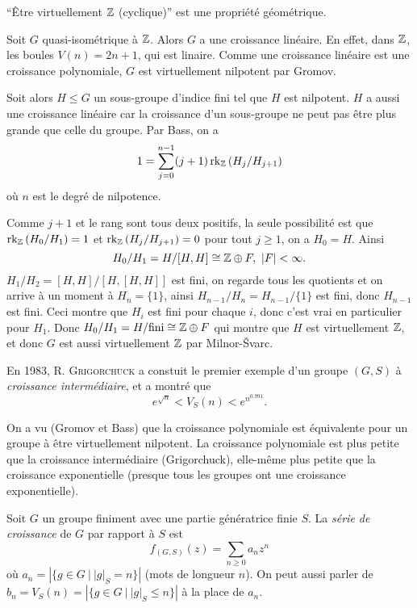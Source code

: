     \begin{cor}
      ``Être virtuellement $\mathbb{Z}$ (cyclique)'' est une propriété géométrique.
    \end{cor}


    \begin{preuve}
      Soit $G$ quasi-isométrique à $\mathbb{Z}$. Alors $G$ a une croissance linéaire. En effet, dans $\mathbb{Z}$, les boules
      $V(n) = 2n + 1$, qui est linaire. Comme une croissance linéaire est une croissance polynomiale, $G$ est
      virtuellement nilpotent par Gromov.

      Soit alors $H \leq G$ un sous-groupe d'indice fini tel que $H$ est nilpotent. $H$ a aussi une croissance
      linéaire car la croissance d'un sous-groupe ne peut pas être plus grande que celle du groupe. Par Bass,
      on a
        \[1 = \sum_{j=0}^{n-1}(j+1)\operatorname{rk}_{\mathbb{Z}}\left(H_j/H_{j+1}\right)\]
      où $n$ est le degré de nilpotence.

      Comme $j+1$ et le rang sont tous deux positifs, la seule possibilité est que $\operatorname{rk}_{\mathbb{Z}}\left(H_0/H_1\right)
      = 1$ et $\operatorname{rk}_{\mathbb{Z}}\left(H_j/H_{j+1}\right) = 0$ pour tout $j \geq 1$, on a $H_0 = H$. Ainsi
      \[H_0/H_1 = H/[H, H] \cong \mathbb{Z} \oplus F,\ |F| < \infty.\]
      $H_1/H_2 = [H, H]/[H, [H, H]]$ est fini, on regarde tous les quotients et on arrive à un moment à
      $H_n = \{1\}$, ainsi $H_{n-1} / H_n = H_{n-1}/\{1\}$ est fini, donc $H_{n-1}$ est fini. Ceci montre que
      $H_i$ est fini pour chaque $i$, donc c'est vrai en particulier pour $H_1$. Donc
      $H_0/H_1 = H/\mathrm{fini} \cong \mathbb{Z} \oplus F$ qui montre que $H$ est virtuellement $\mathbb{Z}$, et donc $G$ est
      aussi virtuellement $\mathbb{Z}$ par Milnor-\v{S}varc.
    \end{preuve}



    En 1983, R. \textsc{Grigorchuck} a constuit le premier exemple d'un groupe $(G, S)$ à \emph{croissance
      intermédiaire}, et a montré que
      \[e^{\sqrt{n}} < V_S(n) < e^{n^{0.991}}.\]

    On a vu (Gromov et Bass) que la croissance polynomiale est équivalente pour un groupe à être virtuellement
    nilpotent. La croissance polynomiale est plus petite que la croissance intermédiaire (Grigorchuck),
    elle-même plus petite que la croissance exponentielle (presque tous les groupes ont une croissance
    exponentielle).




    \begin{defi} 
      Soit $G$ un groupe finiment avec une partie génératrice finie $S$. La \emph{série de croissance} de $G$
      par rapport à $S$ est
        \[f_{(G,S)}(z) = \sum_{n \geq 0}a_nz^n\]
      où $a_n = \left| \{g \in G\ |\ |g|_S = n\} \right|$ (mots de longueur $n$). On peut aussi parler de $b_n
      = V_S(n) = \left| \{g \in G\ |\ |g|_S \leq n\} \right|$ à la place de $a_n$.
    \end{defi}


